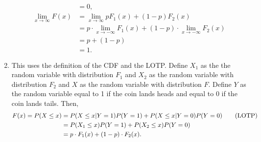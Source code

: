 \begin{exercise}[BH.3.9]
\begin{solution}
\begin{enumerate}
\begin{align*}
			& = 0,\\
			\lim_{x\rightarrow \infty}F(x)& = \lim_{x\rightarrow \infty} pF_1(x) + (1-p)F_{2}(x)\\
			& =p\cdot  \lim_{x\rightarrow-\infty} F_1(x) + (1-p) \cdot  \lim_{x\rightarrow-\infty} F_{2}(x)\\
			& = p + (1-p)\\
			& = 1.
		\end{align*}
		\item This uses the definition of the CDF and the LOTP. Define $X_{1}$ as the the random variable with distribution $F_{1}$ and $X_{2}$ as the random variable with distribution $F_{2}$ and $X$ as the random variable with distribution $F$. Define $Y$ as the random variable equal to 1 if the coin lands heads and equal to 0 if the coin lands tails. Then,
		\begin{align*}
			F(x)=P(X\leq x)& = P(X\leq x|Y=1)P(Y=1) +  P(X\leq x|Y=0)P(Y=0)\tag*{(\text{LOTP})}\\
			&= P(X_{1}\leq x)P(Y=1) + P(X_{2}\leq x)P(Y=0)\\
			&= p\cdot F_{1}(x) + (1-p)\cdot F_{2}(x).
		\end{align*} 
	\end{enumerate}
\end{solution}
\end{exercise}


